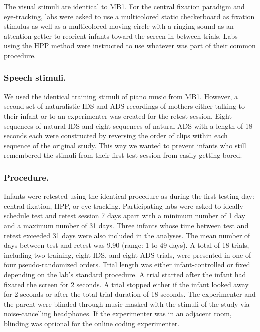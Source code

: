 \documentclass[
  english,
  man,floatsintext]{apa6}
\begin{document}
The visual stimuli are identical to MB1. For the central fixation paradigm and eye-tracking, labs were asked to use a multicolored static checkerboard as fixation stimulus as well as a multicolored moving circle with a ringing sound as an attention getter to reorient infants toward the screen in between trials. Labs using the HPP method were instructed to use whatever was part of their common procedure.

\hypertarget{speech-stimuli.}{%
\subsubsection{Speech stimuli.}\label{speech-stimuli.}}

We used the identical training stimuli of piano music from MB1. However, a second set of naturalistic IDS and ADS recordings of mothers either talking to their infant or to an experimenter was created for the retest session. Eight sequences of natural IDS and eight sequences of natural ADS with a length of 18 seconds each were constructed by reversing the order of clips within each sequence of the original study. This way we wanted to prevent infants who still remembered the stimuli from their first test session from easily getting bored.

\hypertarget{procedure.}{%
\subsubsection{Procedure.}\label{procedure.}}

Infants were retested using the identical procedure as during the first testing day: central fixation, HPP, or eye-tracking. Participating labs were asked to ideally schedule test and retest session 7 days apart with a minimum number of 1 day and a maximum number of 31 days. Three infants whose time between test and retest exceeded 31 days were also included in the analyses. The mean number of days between test and retest was 9.90 (range: 1 to 49 days).
A total of 18 trials, including two training, eight IDS, and eight ADS trials, were presented in one of four pseudo-randomized orders. Trial length was either infant-controlled or fixed depending on the lab's standard procedure. A trial started after the infant had fixated the screen for 2 seconds. A trial stopped either if the infant looked away for 2 seconds or after the total trial duration of 18 seconds. The experimenter and the parent were blinded through music masked with the stimuli of the study via noise-cancelling headphones. If the experimenter was in an adjacent room, blinding was optional for the online coding experimenter.
\end{document}
